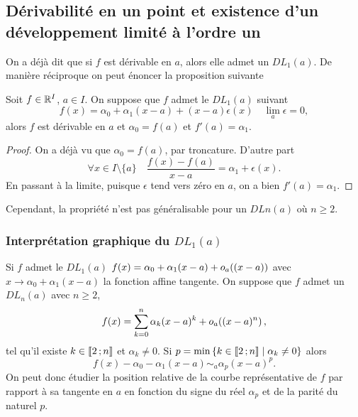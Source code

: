\subsection{Dérivabilité en un point et existence d'un développement limité à
l'ordre un}
On a déjà dit que si \(f\) est dérivable en \(a\), alors elle admet un
\(DL_1(a)\). De manière réciproque on peut énoncer la proposition suivante
\begin{prop}
  Soit \(f \in \mathbb{R}^I\), \(a \in I\). On suppose que \(f\) admet le \(DL_1(a)\)
  suivant
  \begin{equation}
    f(x)=\alpha_0 +\alpha_1(x-a) +(x-a) \epsilon(x) \quad \lim_a \epsilon =0,
  \end{equation}
  alors \(f\) est dérivable en \(a\) et \(\alpha_0=f(a)\) et \(f'(a)=\alpha_1\).
\end{prop}
\begin{proof}
  On a déjà vu que \(\alpha_0=f(a)\), par troncature. D'autre part
  \begin{equation}
    \forall x \in I\setminus\{a\} \quad \frac{f(x)-f(a)}{x-a} = \alpha_1
    +\epsilon(x).
  \end{equation}
  En passant à la limite, puisque \(\epsilon\) tend vers zéro en \(a\), on a
  bien \(f'(a)=\alpha_1\).
\end{proof}
Cependant, la propriété n'est pas généralisable pour un \(DLn(a)\) où \(n
\geqslant 2\).

\subsubsection{Interprétation graphique du \(DL_1(a)\)}

Si \(f\) admet le \(DL_1(a)\) \(f(x)=\alpha_0 +\alpha_1(x-a)
+o\mathopen{}_{a}\left((x-a)\right)\) avec \(x \longrightarrow \alpha_0 +\alpha_1(x-a)\) la
fonction affine tangente. On suppose que \(f\) admet un \(DL_n(a)\) avec \(n
\geqslant 2\),
\begin{equation}
  f(x) = \sum_{k=0}^n \alpha_k (x-a)^k +o\mathopen{}_{a}\left((x-a)^n\right),
\end{equation}
tel qu'il existe \(k \in \mathopen{\llbracket}2\mathclose{}\mathpunct{};n\mathclose{\rrbracket}\) et \(\alpha_k \neq 0\). Si
\(p=\min\left\{k \in \mathopen{\llbracket}2\mathclose{}\mathpunct{};n\mathclose{\rrbracket}\mathrel{}\middle|\mathrel{}\alpha_k \neq 0\right\}\) alors
\begin{equation}
  f(x) - \alpha_0 - \alpha_1(x-a) \sim_a \alpha_p (x-a)^p.
\end{equation}
On peut donc étudier la position relative de la courbe représentative de \(f\)
par rapport à sa tangente en \(a\) en fonction du signe du réel \(\alpha_p\) et
de la parité du naturel \(p\).

